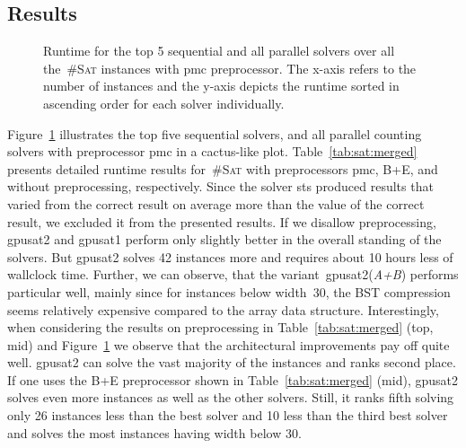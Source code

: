 \documentclass{llncs}
\newcommand{\cSAT}{\textsc{\#Sat}\xspace}%
\newcommand{\gpusatnu}{{\small\textsf{gpusat2}}\xspace}
\newcommand{\gpusatnuv}[1]{{\small\textsf{gpusat2({\textit{#1}})}}\xspace}
\newcommand{\gpusatone}{{\small\textsf{gpusat1}}\xspace}
\begin{document}
\subsection{Results} %

%
%
%
%
%
%
%
%
%
%


\begin{figure}[t]
  \centering
  \caption{Runtime for the top 5 sequential and all parallel solvers over all the~\cSAT instances with pmc preprocessor. %
    The x-axis refers to the number of instances and the y-axis
    depicts the runtime sorted in ascending order for each solver
    individually.  }
  \label{fig:runtime}
\end{figure}
%
Figure~\ref{fig:runtime} illustrates the top five sequential solvers,
and all parallel counting solvers %
%
with preprocessor pmc %
%
in a cactus-like plot. 
Table~\ref{tab:sat:merged} presents detailed runtime
results for~\cSAT with preprocessors pmc, B+E, and without preprocessing, respectively.
%
%
%
%
%
%
%
%
%
%
%
%
%
%
%
%
Since the solver sts produced results that varied from the correct
result on average more than the value of the correct result, %
%
%
%
%
%
we excluded it from the presented results.  If we disallow
preprocessing, \gpusatnu and \gpusatone perform only slightly better
in the overall standing of the solvers. But \gpusatnu solves 42
instances more and requires about 10 hours less of wallclock
time. Further, we can observe, that %
the variant~\gpusatnuv{A+B} performs particular well, mainly since for
instances below width~30, the BST compression seems relatively
expensive compared to the array data structure.
%
%
%
%
%
Interestingly, when considering the results on preprocessing in
Table~\ref{tab:sat:merged} (top, mid) and Figure~\ref{fig:runtime} we
observe that the architectural improvements pay off quite
well. \gpusatnu can solve the vast majority of the instances and
ranks second place.  If one uses the B+E preprocessor shown in
Table~\ref{tab:sat:merged} (mid), \gpusatnu solves even more instances
as well as the other solvers. Still, it ranks fifth solving only 26
instances less than the best solver and 10 less than the third best
solver and solves the most instances having width below 30.
\end{document}
